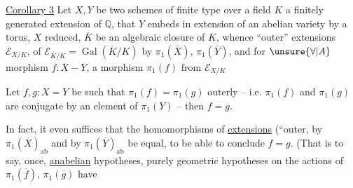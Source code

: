 \uline{Corollary 3} Let  $X,Y$ be two schemes of finite type over a field $K$ a finitely generated extension of $\mathbb Q$,   that $Y$ embeds in   extension of an abelian variety by a torus, $X$ reduced,   $\overline K$ be an algebraic closure of $K$, whence ``outer'' extensions $\mathcal E_{X/K}$,  of $\mathcal E_{\overline K/K}=\operatorname{Gal}(\overline K/K)$ by $\pi_1(\overline X)$, $\pi_1(\overline Y)$, and for $\unsure{\forall|A}$ morphism $f:X-Y$, a morphism $\pi_1(f)$ from $\mathcal E_{X/K}$ 

Let $f,g:X=Y$ be such that $\pi_1(f)=\pi_1(g)$ outerly -- i.e. $\pi_1(f)$ and $\pi_1(g)$ are conjugate by an element of $\pi_1(Y)$ -- then $f=g$.

In fact, it even suffices that the homomorphisms of \uline{extensions} (``outer,  by $\pi_1(\overline X)_{\mathrm{ab}}$ and by $\pi_1(\overline Y)_{\mathrm{ab}}$ be equal, to be able to conclude $f=g$. (That is to say, once,   \uline{anabelian} hypotheses, purely geometric hypotheses on the actions of $\pi_1(\overline f)$, $\pi_1(\overline g)$ have  
